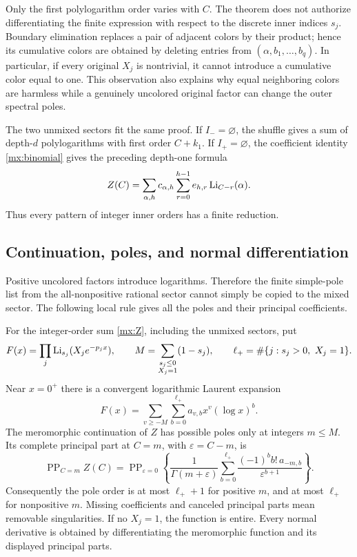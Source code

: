 \begin{remark}
Only the first polylogarithm order varies with $C$.  The theorem does
not authorize differentiating the finite expression with respect to
the discrete inner indices $s_j$.  Boundary elimination replaces a
pair of adjacent colors by their product; hence its cumulative colors
are obtained by deleting entries from
$(\alpha,b_1,\ldots,b_q)$.  In particular, if every original $X_j$
is nontrivial, it cannot introduce a cumulative color equal to one.
This observation also explains why equal neighboring colors are
harmless while a genuinely uncolored original factor can change the
outer spectral poles.
\end{remark}

The two unmixed sectors fit the same proof.  If $I_-=\varnothing$,
the shuffle gives a sum of depth-$d$ polylogarithms with first order
$C+k_1$.  If $I_+=\varnothing$, the coefficient identity
\eqref{mx:binomial} gives the preceding depth-one formula
\[
 Z(C)=\sum_{\alpha,h}c_{\alpha,h}
                    \sum_{r=0}^{h-1}e_{h,r}\operatorname{Li}_{C-r}(\alpha).
\]
Thus every pattern of integer inner orders has a finite reduction.

\subsection{Continuation, poles, and normal differentiation}

Positive uncolored factors introduce logarithms.  Therefore the
finite simple-pole list from the all-nonpositive rational sector
cannot simply be copied to the mixed sector.  The following local
rule gives all the poles and their principal coefficients.

\begin{theorem}
\label{mx:poles}
For the integer-order sum \eqref{mx:Z}, including the unmixed sectors,
put
\[
 F(x)=\prod_j\operatorname{Li}_{s_j}(X_je^{-p_jx}),\qquad
 M=\sum_{\substack{s_j\leq0\\X_j=1}}(1-s_j),\qquad
 \ell_+=\#\{j:s_j>0,\ X_j=1\}.
\]
Near $x=0^+$ there is a convergent logarithmic Laurent expansion
\begin{equation}\label{mx:locallaurent}
 F(x)=\sum_{v\geq-M}\sum_{b=0}^{\ell_+} a_{v,b}x^v(\log x)^b.
\end{equation}
The meromorphic continuation of $Z$ has possible poles only at
integers $m\leq M$.  Its complete principal part at $C=m$, with
$\varepsilon=C-m$, is
\begin{equation}\label{mx:principal}
 \operatorname{PP}_{C=m}Z(C)
 =\operatorname{PP}_{\varepsilon=0}\left\{
  \frac1{\Gamma(m+\varepsilon)}
    \sum_{b=0}^{\ell_+}\frac{(-1)^bb!\,a_{-m,b}}
                        {\varepsilon^{b+1}}\right\}.
\end{equation}
Consequently the pole order is at most $\ell_++1$ for positive $m$, and
at most $\ell_+$ for nonpositive $m$.  Missing coefficients and canceled
principal parts mean removable singularities.  If no $X_j=1$,
the function is entire.  Every normal derivative is obtained by
differentiating the meromorphic function and its displayed principal
parts.
\end{theorem}


